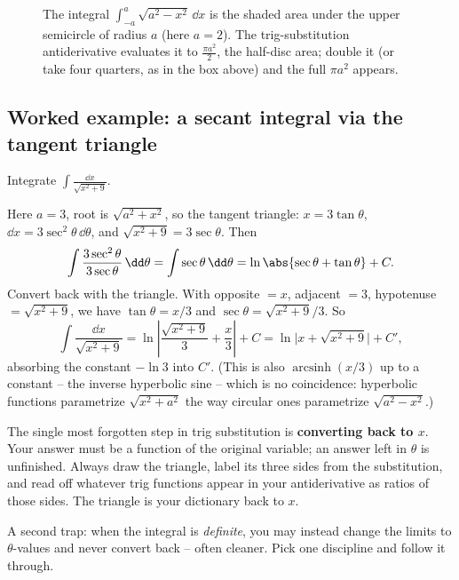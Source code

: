 \begin{figure}[H]
\centering
{}
\caption{The integral $\int_{-a}^{a}\sqrt{a^2-x^2}\,\dd x$ is the shaded area
under the upper semicircle of radius $a$ (here $a=2$). The trig-substitution
antiderivative evaluates it to $\tfrac{\pi a^2}{2}$, the half-disc area; double
it (or take four quarters, as in the box above) and the full $\pi a^2$ appears.}
\label{ch24:fig-semicircle}
\end{figure}

\subsection{Worked example: a secant integral via the tangent triangle}

\begin{example}[Root of $a^2 + x^2$]
\label{ch24:ex-tan}
Integrate $\displaystyle \int \frac{\dd x}{\sqrt{x^2 + 9}}.$
\end{example}

Here $a = 3$, root is $\sqrt{a^2 + x^2}$, so the tangent triangle:
$x = 3\tan\theta$, $\dd x = 3\sec^2\theta\,\dd\theta$, and $\sqrt{x^2+9} =
3\sec\theta$. Then
\[
\int \frac{3\sec^2\theta}{3\sec\theta}\,\dd\theta
= \int \sec\theta\,\dd\theta
= \ln\abs{\sec\theta + \tan\theta} + C.
\]
Convert back with the triangle. With opposite $= x$, adjacent $= 3$,
hypotenuse $= \sqrt{x^2+9}$, we have $\tan\theta = x/3$ and $\sec\theta =
\sqrt{x^2+9}/3$. So
\[
\int \frac{\dd x}{\sqrt{x^2+9}}
= \ln\left|\frac{\sqrt{x^2+9}}{3} + \frac{x}{3}\right| + C
= \ln\big|x + \sqrt{x^2+9}\big| + C',
\]
absorbing the constant $-\ln 3$ into $C'$. (This is also $\operatorname{arcsinh}(x/3)$
up to a constant -- the inverse hyperbolic sine -- which is no coincidence:
hyperbolic functions parametrize $\sqrt{x^2+a^2}$ the way circular ones
parametrize $\sqrt{a^2-x^2}$.)

\begin{trapbox}
The single most forgotten step in trig substitution is \textbf{converting back
to $x$}. Your answer must be a function of the original variable; an answer
left in $\theta$ is unfinished. Always draw the triangle, label its three
sides from the substitution, and read off whatever trig functions appear in
your antiderivative as ratios of those sides. The triangle is your dictionary
back to $x$.

A second trap: when the integral is \emph{definite}, you may instead change the
limits to $\theta$-values and never convert back -- often cleaner. Pick one
discipline and follow it through.
\end{trapbox}


